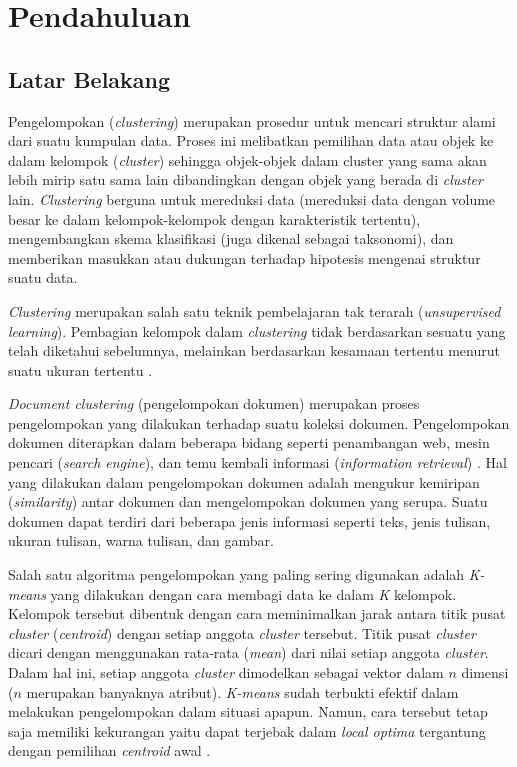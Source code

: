 \chapter{Pendahuluan}
\label{chap:intro}
   
\section{Latar Belakang}
\label{sec:label}

Pengelompokan (\textit{clustering}) merupakan prosedur untuk mencari struktur alami dari suatu kumpulan data. Proses ini melibatkan pemilihan data atau objek ke dalam kelompok (\textit{cluster}) sehingga objek-objek dalam cluster yang sama akan lebih mirip satu sama lain dibandingkan dengan objek yang berada di \textit{cluster} lain. \textit{Clustering} berguna untuk mereduksi data (mereduksi data dengan volume besar ke dalam kelompok-kelompok dengan karakteristik tertentu), mengembangkan skema klasifikasi (juga dikenal sebagai taksonomi), dan memberikan masukkan atau dukungan terhadap hipotesis mengenai struktur suatu data.

\textit{Clustering} merupakan salah satu teknik pembelajaran tak terarah (\textit{unsupervised learning}). Pembagian kelompok dalam \textit{clustering} tidak berdasarkan sesuatu yang telah diketahui sebelumnya, melainkan berdasarkan kesamaan tertentu menurut suatu ukuran tertentu \cite{raposo2014automatic}.

\textit{Document clustering} (pengelompokan dokumen) merupakan proses pengelompokan yang dilakukan terhadap suatu koleksi dokumen. Pengelompokan dokumen diterapkan dalam beberapa bidang seperti penambangan web, mesin pencari (\textit{search engine}), dan temu kembali informasi (\textit{information retrieval}) \cite{shah2012document}. Hal yang dilakukan dalam pengelompokan dokumen adalah mengukur kemiripan (\textit{similarity}) antar dokumen dan mengelompokan dokumen yang serupa. Suatu dokumen dapat terdiri dari beberapa jenis informasi seperti teks, jenis tulisan, ukuran tulisan, warna tulisan, dan gambar. 

Salah satu algoritma pengelompokan yang paling sering digunakan adalah \textit{K-means} yang dilakukan dengan cara membagi data ke dalam \textit{K} kelompok. Kelompok tersebut dibentuk dengan cara meminimalkan jarak antara titik pusat \textit{cluster} (\textit{centroid}) dengan setiap anggota \textit{cluster} tersebut. Titik pusat \textit{cluster} dicari dengan menggunakan rata-rata (\textit{mean}) dari nilai setiap anggota \textit{cluster}. Dalam hal ini, setiap anggota \textit{cluster} dimodelkan sebagai vektor dalam $n$ dimensi ($n$ merupakan banyaknya atribut). \textit{K-means} sudah terbukti efektif dalam melakukan pengelompokan  dalam situasi apapun. Namun, cara tersebut tetap saja memiliki kekurangan yaitu dapat terjebak dalam \textit{local optima} tergantung dengan pemilihan \textit{centroid} awal \cite{maulik2000genetic}.


